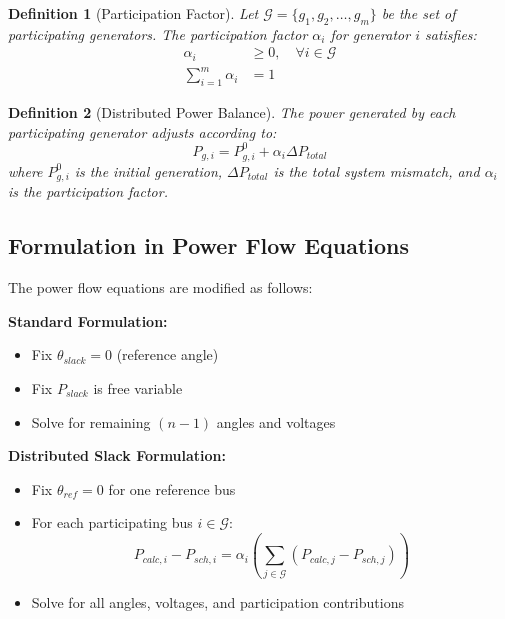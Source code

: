 \documentclass[11pt]{article}
\newtheorem{definition}{Definition}
\begin{document}
\begin{definition}[Participation Factor]
Let $\mathcal{G} = \{g_1, g_2, \ldots, g_m\}$ be the set of participating generators. The participation factor $\alpha_i$ for generator $i$ satisfies:
\begin{align}
\alpha_i &\geq 0, \quad \forall i \in \mathcal{G} \\
\sum_{i=1}^m \alpha_i &= 1
\end{align}
\end{definition}

\begin{definition}[Distributed Power Balance]
The power generated by each participating generator adjusts according to:
\begin{equation}
P_{g,i} = P_{g,i}^0 + \alpha_i \Delta P_{total}
\label{eq:dist_slack}
\end{equation}
where $P_{g,i}^0$ is the initial generation, $\Delta P_{total}$ is the total system mismatch, and $\alpha_i$ is the participation factor.
\end{definition}

\subsection{Formulation in Power Flow Equations}

The power flow equations are modified as follows:

\textbf{Standard Formulation:}
\begin{itemize}
    \item Fix $\theta_{slack} = 0$ (reference angle)
    \item Fix $P_{slack}$ is free variable
    \item Solve for remaining $(n-1)$ angles and voltages
\end{itemize}

\textbf{Distributed Slack Formulation:}
\begin{itemize}
    \item Fix $\theta_{ref} = 0$ for one reference bus
    \item For each participating bus $i \in \mathcal{G}$:
    \begin{equation}
    P_{calc,i} - P_{sch,i} = \alpha_i \left( \sum_{j \in \mathcal{G}} (P_{calc,j} - P_{sch,j}) \right)
    \label{eq:dist_slack_constraint}
    \end{equation}
    \item Solve for all angles, voltages, and participation contributions
\end{itemize}
\end{document}
